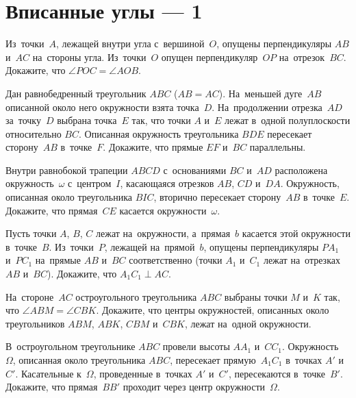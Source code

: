 
\section*{Вписанные углы --- 1}


\begin{problems}

\item
Из~точки~$A$, лежащей внутри угла с~вершиной~$O$, опущены перпендикуляры $AB$
и~$AC$ на~стороны угла.
Из~точки~$O$ опущен перпендикуляр~$OP$ на~отрезок~$BC$.
Докажите, что $\angle POC = \angle AOB$.

\item
Дан равнобедренный треугольник $ABC$ ($AB = AC$).
На~меньшей дуге~$AB$ описанной около него окружности взята точка~$D$.
На~продолжении отрезка~$AD$ за~точку~$D$ выбрана точка~$E$ так,
что точки $A$ и~$E$ лежат в~одной полуплоскости относительно $BC$.
Описанная окружность треугольника $BDE$ пересекает сторону~$AB$ в~точке~$F$.
Докажите, что прямые $EF$ и~$BC$ параллельны.

\item
Внутри равнобокой трапеции $ABCD$ с~основаниями $BC$ и~$AD$ расположена
окружность~$\omega$ с~центром~$I$, касающаяся отрезков $AB$, $CD$ и~$DA$.
Окружность, описанная около треугольника $BIC$, вторично пересекает
сторону~$AB$ в~точке~$E$.
Докажите, что прямая~$CE$ касается окружности~$\omega$.

\item
Пусть точки $A$, $B$, $C$ лежат на~окружности, а~прямая~$b$ касается этой
окружности в~точке~$B$.
Из~точки~$P$, лежащей на~прямой~$b$, опущены перпендикуляры $P A_1$ и~$P C_1$
на~прямые $AB$ и~$BC$ соответственно
(точки $A_1$ и~$C_1$ лежат на~отрезках $AB$ и~$BC$).
Докажите, что $A_1 C_1 \perp AC$.

\item
На~стороне~$AC$ остроугольного треугольника $ABC$ выбраны точки $M$ и~$K$ так,
что $\angle ABM = \angle CBK$.
Докажите, что центры окружностей, описанных около треугольников $ABM$, $ABK$,
$CBM$ и~$CBK$, лежат на~одной окружности.

\item
В~остроугольном треугольнике $ABC$ провели высоты $A A_1$ и~$C C_1$.
Окружность~$\Omega$, описанная около треугольника $ABC$, пересекает
прямую~$A_1 C_1$ в~точках $A'$ и~$C'$.
Касательные к~$\Omega$, проведенные в~точках $A'$ и~$C'$, пересекаются
в~точке~$B'$.
Докажите, что прямая~$BB'$ проходит через центр окружности~$\Omega$.


\end{problems}
